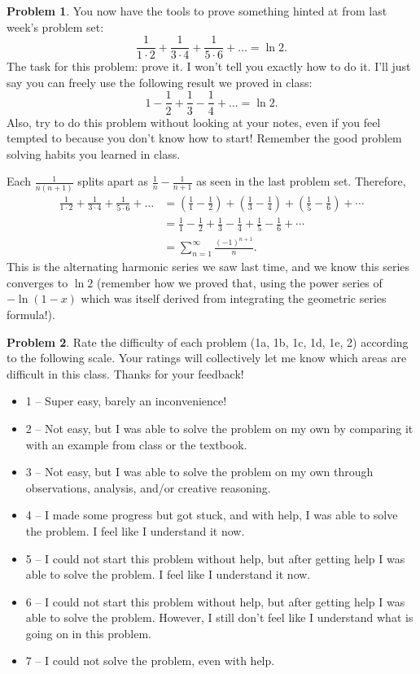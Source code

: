 \documentclass[11pt,oneside]{amsart}
\theoremstyle{definition}
\newtheorem{problem}{Problem}
\theoremstyle{plain}
\begin{document}
\begin{problem}
You now have the tools to prove something hinted at from last week's problem set:
\[\frac 1{1\cdot 2}+\frac 1{3\cdot 4}+\frac 1{5\cdot 6}+\dots=\ln 2.\]
The task for this problem: prove it. I won't tell you exactly how to do it. I'll just say you can freely use the following result we proved in class:
\[1-\frac12+\frac13-\frac 14+\dots=\ln 2.\]
Also, try to do this problem without looking at your notes, even if you feel tempted to because you don't know how to start! Remember the good problem solving habits you learned in class.
\end{problem}
\begin{solution}
  Each $\frac 1{n(n+1)}$ splits apart as $\frac 1n-\frac 1{n+1}$ as seen in the last problem set. Therefore,
  \[\begin{split}
      \frac 1{1\cdot 2}+\frac 1{3\cdot 4}+\frac 1{5\cdot 6}+\dots &= \left( \frac 11-\frac12 \right)+\left( \frac 13-\frac 14 \right)+\left( \frac 15-\frac 16 \right)+\cdots\\
      &= \frac 11-\frac 12+\frac13-\frac14+\frac15-\frac16+\cdots\\
      &= \sum_{n=1}^\infty \frac{(-1)^{n+1}}{n}.
    \end{split}\]
  This is the alternating harmonic series we saw last time, and we know this series converges to $\ln 2$ (remember how we proved that, using the power series of $-\ln(1-x)$ which was itself derived from integrating the geometric series formula!).
\end{solution}

\begin{problem}
Rate the difficulty of each problem (1a, 1b, 1c, 1d, 1e, 2) according to the following scale. Your ratings will collectively let me know which areas are difficult in this class. Thanks for your feedback!
\begin{itemize}
  \item 1 -- Super easy, barely an inconvenience!
  \item 2 -- Not easy, but I was able to solve the problem on my own by comparing it with an example from class or the textbook.
  \item 3 -- Not easy, but I was able to solve the problem on my own through observations, analysis, and/or creative reasoning.
  \item 4 -- I made some progress but got stuck, and with help, I was able to solve the problem. I feel like I understand it now.
  \item 5 -- I could not start this problem without help, but after getting help I was able to solve the problem. I feel like I understand it now.
  \item 6 -- I could not start this problem without help, but after getting help I was able to solve the problem. However, I still don't feel like I understand what is going on in this problem.
  \item 7 -- I could not solve the problem, even with help.
\end{itemize}
\end{problem}
\end{document}

